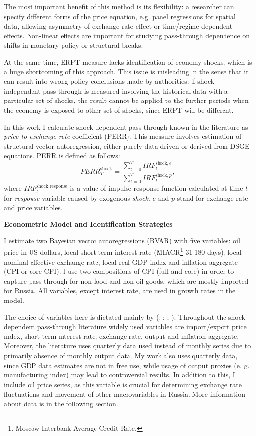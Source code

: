 \documentclass[12pt, a4paper]{extarticle}
\begin{document}
The most important benefit of this method is its flexibility: a researcher can specify different forms of the price equation, e.g. panel regressions for spatial data, allowing asymmetry of exchange rate effect or time/regime-dependent effects. Non-linear effects are important for studying pass-through dependence on shifts in monetary policy or structural breaks. 

At the same time, ERPT measure lacks identification of economy shocks, which is a huge shortcoming of this approach. This issue is misleading in the sense that it can result into wrong policy conclusions made by authorities: if shock-independent pass-through is measured involving the historical data with a particular set of shocks, the result cannot be applied to the further periods when the economy is exposed to other set of shocks, since ERPT will be different.

In this work I calculate shock-dependent pass-through known in the literature as \textit{price-to-exchange rate} coefficient (PERR). This measure involves estimation of structural vector autoregression, either purely data-driven or derived from DSGE equations. PERR is defined as follows:
\begin{equation}
	PERR^{\text{shock}}_{T} = \frac{\sum_{t=0}^{T}IRF^{\text{shock}, e}_{t}}{\sum_{t=0}^{T}IRF_{t}^{\text{shock}, p}},
\end{equation}
where $IRF^{\text{shock}, \text{response}}_{t}$ is a value of impulse-response function calculated at time $t$ for \textit{response} variable caused by exogenous \textit{shock}. $e$ and $p$ stand for exchange rate and price variables.

\begin{center}
	\textbf{Econometric Model and Identification Strategies}
\end{center}

I estimate two Bayesian vector autoregressions (BVAR) with five variables: oil price in US dollars, local short-term interest rate (MIACR\footnote{Moscow Interbank Average Credit Rate.} 31-180 days), local nominal effective exchange rate, local real GDP index and inflation aggregate (CPI or core CPI). I use two compositions of CPI (full and core) in order to capture pass-through for non-food and non-oil goods, which are mostly imported for Russia. All variables, except interest rate, are used in growth rates in the model.

The choice of variables here is dictated mainly by (\cite{Hahn2003}; \cite{Comunale2017}; \cite{Forbes2018}; \cite{LeivaLeon2019}). Throughout the shock-dependent pass-through literature widely used variables are import/export price index, short-term interest rate, exchange rate, output and inflation aggregate. Moreover, the literature uses quarterly data used instead of monthly series due to primarily absence of monthly output data. My work also uses quarterly data, since GDP data estimates are not in free use, while usage of output proxies (e. g. manufacturing index) may lead to controversial results. In addition to this, I include oil price series, as this variable is crucial for determining exchange rate fluctuations and movement of other macrovariables in Russia. More information about data is in the following section.
\end{document}
